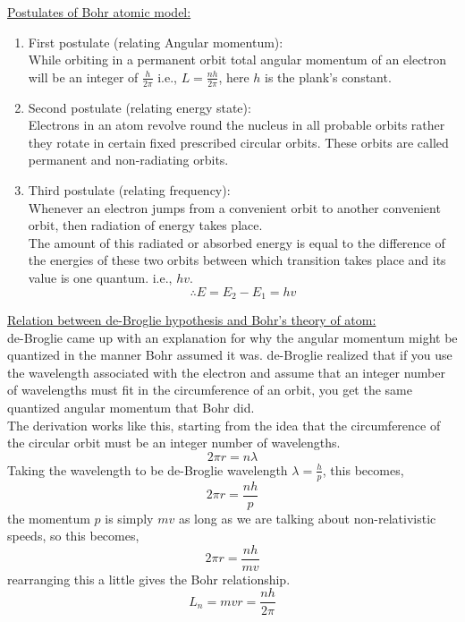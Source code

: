 \documentclass[../main.tex]{subfiles}
\begin{document}
\begin{soln}
    \underline{Postulates of Bohr atomic model:}
    \begin{enumerate}
        \item First postulate (relating Angular momentum):\\ While orbiting in a permanent orbit total angular momentum of an electron will be an integer of $ \frac{h}{2\pi} $ i.e., $ L=\frac{nh}{2\pi} $, here $ h $ is the plank's constant.
        \item Second postulate (relating energy state):\\ Electrons in an atom revolve round the nucleus in all probable orbits rather they rotate in certain fixed prescribed circular orbits. These orbits are called permanent and non-radiating orbits.
        \item Third postulate (relating frequency):\\ Whenever an electron jumps from a convenient orbit to another convenient orbit, then radiation of energy takes place.\\
        

        The amount of this radiated or absorbed energy is equal to the difference of the energies of these two orbits between which transition takes place and its value is one quantum. i.e., $ hv $.
        \[\therefore E=E_2-E_1=hv\]
    \end{enumerate}
    \underline{Relation between de-Broglie hypothesis and Bohr's theory of atom:}\\
    de-Broglie came up with an explanation for why the angular momentum might be quantized in the manner Bohr assumed it was. de-Broglie realized that if you use the wavelength associated with the electron and assume that an integer number of wavelengths must fit in the circumference of an orbit, you get the same quantized angular momentum that Bohr did.\\

    The derivation works like this, starting from the idea that the circumference of the circular orbit must be an integer number of wavelengths.
    \[2\pi r=n\lambda\]
    Taking the wavelength to be de-Broglie wavelength $ \lambda=\frac{h}{p} $, this becomes,
    \[2\pi r=\frac{nh}{p}\]
    the momentum $ p $ is simply $ mv $ as long as we are talking about non-relativistic speeds, so this becomes,
    \[2\pi r=\frac{nh}{mv}\]
    rearranging this a little gives the Bohr relationship.
    \[L_n=mv r=\frac{nh}{2\pi}\]
\end{soln}
\newpage
\end{document}
